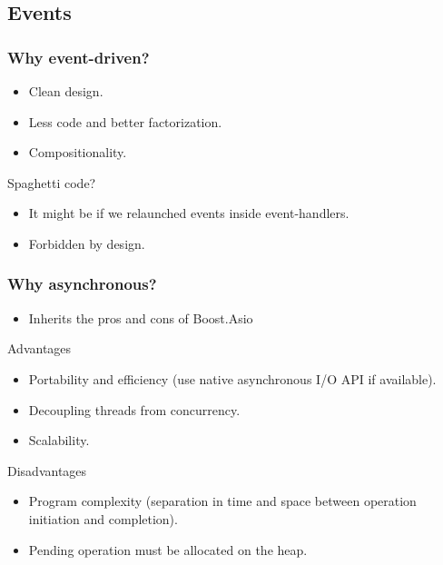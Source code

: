\documentclass[xcolor=dvipsnames]{beamer}
\begin{document}
\subsection{Events}

\begin{frame}
\frametitle{Why event-driven?}

\begin{itemize}
  \item Clean design.
  \item Less code and better factorization.
  \item Compositionality.
\end{itemize}

\begin{block}{Spaghetti code?}
\begin{itemize}
  \item It might be if we relaunched events inside event-handlers.
  \item Forbidden by design.
\end{itemize}
\end{block}
\end{frame}

\begin{frame}
\frametitle{Why asynchronous?}

\begin{itemize}
\item Inherits the pros and cons of Boost.Asio
\end{itemize}

\begin{exampleblock}{Advantages}
\begin{itemize}
  \item Portability and efficiency (use native asynchronous I/O API if available).
  \item Decoupling threads from concurrency.
  \item Scalability.
\end{itemize}
\end{exampleblock}

\begin{alertblock}{Disadvantages}
\begin{itemize}
  \item Program complexity (separation in time and space between operation initiation and completion).
  \item Pending operation must be allocated on the heap.
\end{itemize}
\end{alertblock}
\end{frame}
\end{document}
